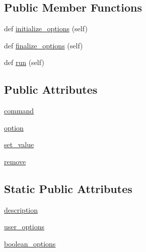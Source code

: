 \subsection*{Public Member Functions}
\begin{DoxyCompactItemize}
\item 
def \hyperlink{classsetuptools_1_1command_1_1setopt_1_1setopt_af8e183abb2cbd9fcba068aacc26bc559}{initialize\+\_\+options} (self)
\item 
def \hyperlink{classsetuptools_1_1command_1_1setopt_1_1setopt_acaf07b6c01a56f8c8629dfcfbe8e3872}{finalize\+\_\+options} (self)
\item 
def \hyperlink{classsetuptools_1_1command_1_1setopt_1_1setopt_aa7fb6e59e7688c1d8a93e2fb6bcd3b75}{run} (self)
\end{DoxyCompactItemize}
\subsection*{Public Attributes}
\begin{DoxyCompactItemize}
\item 
\hyperlink{classsetuptools_1_1command_1_1setopt_1_1setopt_a661e8cc13e8f2ad16bd1786e0557eaf3}{command}
\item 
\hyperlink{classsetuptools_1_1command_1_1setopt_1_1setopt_aaeecee84249dd61d1244d7d0f5fe4b57}{option}
\item 
\hyperlink{classsetuptools_1_1command_1_1setopt_1_1setopt_ae7d35dee0885a7f5eeefd36772e47ed5}{set\+\_\+value}
\item 
\hyperlink{classsetuptools_1_1command_1_1setopt_1_1setopt_ad1ad67d2184093424704a1b6253da442}{remove}
\end{DoxyCompactItemize}
\subsection*{Static Public Attributes}
\begin{DoxyCompactItemize}
\item 
\hyperlink{classsetuptools_1_1command_1_1setopt_1_1setopt_a55e0672a40bcd8d74607a78d5cc2a48f}{description}
\item 
\hyperlink{classsetuptools_1_1command_1_1setopt_1_1setopt_af7d52515830d41afde5a8167f64f7d3d}{user\+\_\+options}
\item 
\hyperlink{classsetuptools_1_1command_1_1setopt_1_1setopt_aba096fa53070c99799bf479a166a790d}{boolean\+\_\+options}
\end{DoxyCompactItemize}


